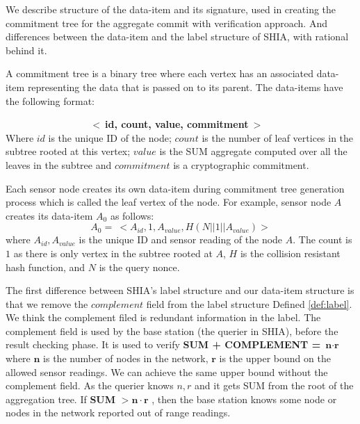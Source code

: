 	We describe structure of the data-item and its signature, used in creating the commitment tree for the aggregate commit with verification approach. And differences between the data-item and the label structure of SHIA, with rational behind it.
	\begin{definition}
		\label{def:data-item}
		A commitment tree is a binary tree where each vertex has an associated data-item representing the data that is passed on to its parent. The data-items have the following format:

		$\hspace{100pt}$ \textbf{$<\ $id, count, value, commitment$\ >$}\\
	Where $id$ is the unique ID of the node; $count$ is the number of leaf vertices in the subtree rooted at this vertex; $value$ is the SUM aggregate computed over all the leaves in the subtree and $commitment$ is a cryptographic commitment.
	\end{definition}
	Each sensor node creates its own data-item during commitment tree generation process which is called the leaf vertex of the node.
	For example, sensor node $A$ creates its data-item $A_{0}$ as follows:
	\begin{equation}
		\label{eq:data-item}
	 	A_{0} =\ <A_{id}, 1, A_{value}, H(N||1||A_{value})>
	 \end{equation}
	where $A_{id}, A_{value}$ is the unique ID and sensor reading of the node $A$. 
	The count is $1$ as there is only vertex in the subtree rooted at $A$, $H$ is the collision resistant hash function, and $N$ is the query nonce.

	The first difference between SHIA's label structure and our data-item structure is that we remove the $complement$ field from the label structure Defined \ref{def:label}. 
	We think the complement filed is redundant information in the label. 
	The complement field is used by the base station (the querier in SHIA), before the result checking phase.
	It is used to verify \textbf{SUM + COMPLEMENT =} $\textbf{n} \cdot \textbf{r}$ where $\textbf{n}$ is the number of nodes in the network, $\textbf{r}$ is the upper bound on the allowed sensor readings.
	We can achieve the same upper bound without the complement field.
	As the querier knows $n, r$ and it gets SUM from the root of the aggregation tree.
	If \textbf{SUM} $> \textbf{n} \cdot \textbf{r}$ , then the base station knows some node or nodes in the network reported out of range readings.

